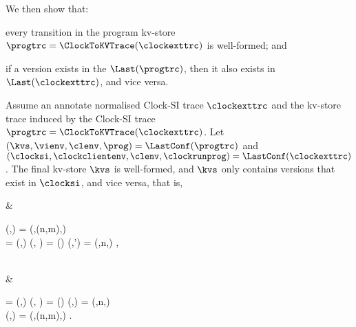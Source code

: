 We then show that:
\begin{enumerate*}
\item every transition in the program kv-store \( \progtrc = \ClockToKVTrace(\clockexttrc)\) is well-formed; and
\item if a version exists in the \( \Last(\progtrc) \), 
then it also exists in  \( \Last(\clockexttrc) \), and vice versa.
\end{enumerate*}                                


\begin{toappendix}
\label{sec:proof-well-formed-clock-si-to-kvs}
\end{toappendix}
\begin{theoremrep}
\label{thm:well-formed-clock-trace}
Assume an annotate normalised Clock-SI trace \( \clockexttrc \)
and the kv-store trace induced by the Clock-SI trace \( \progtrc = \ClockToKVTrace(\clockexttrc)\).
Let \( (\kvs,\vienv,\clenv,\prog) = \LastConf(\progtrc) \) and \( (\clocksi,\clockclientenv,\clenv,\clockrunprog) = \LastConf(\clockexttrc) \).
The final kv-store \(\kvs\) is well-formed,
and \( \kvs \) only contains versions that exist in \( \clocksi \), and vice versa,
that is,
\begin{Formulae}
& \begin{Formula}
    \kvs(\key,\idx) = (\val,\clocktxid[\cl](n,m),\txidset) 
    \implies {} 
    \\ \clockshard = \ShardOf(\clocksi,\key) 
    \land (\clockkvs, \stub) = \clocksi(\clockshard)
    \land \clockkvs(\key,\idx') = (\val,n,\stub) ,
    \label{equ:kvs-to-clock-si}
\end{Formula}
\\ & \begin{Formula}
    \clockshard = \ShardOf(\clocksi,\key) 
    \land (\clockkvs, \stub) = \clocksi(\clockshard)
    \land \clockkvs(\key,\idx) = (\val,n,\stub) 
    \implies
    \\  
    \kvs(\key,\idx) = (\val,\clocktxid[\cl](n,m),\txidset)  .
    \label{equ:clock-si-to-kvs}
\end{Formula}
\end{Formulae}

\end{theoremrep}
